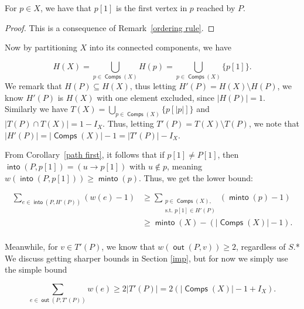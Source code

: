 \documentclass{article}
\DeclareMathOperator{\minto}{\bm{\mathsf{minto}}}
\DeclareMathOperator{\out}{\bm{\mathsf{out}}}
\DeclareMathOperator{\into}{\bm{\mathsf{into}}}
\DeclareMathOperator{\Comp}{\bm{\mathsf{Comps}}}
\newcommand{\edit}[1]{}%
\newcommand{\dc}[1]{}%
\newcommand{\zh}[1]{}%
\begin{document}
\vspace{1.75em}

\begin{cor}\label{path first} For $p \in X$, we have that $p[1]$ is the first vertex in $p$ reached by $P$. \begin{proof}This is a consequence of Remark~\ref{ordering rule}.\end{proof}\end{cor}

\vspace{1.75em}

Now by partitioning $X$ into its connected components, we have

\[H(X) = \bigcup_{p \in \Comp(X)} H(p) = \bigcup_{p \in \Comp(X)} \{p[1]\}.\]\edit{could try to better convey that this is true for any graph, and is not specific to $X$ }We remark that $H(P) \subseteq H(X)$, thus letting $H'(P) = H(X)\setminus H(P)$, we know $H'(P)$ is $H(X)$ with one element excluded, since $|H(P)| = 1$. Similarly we have $T(X) = \bigcup_{p \in \Comp(X)} \{p[|p|]\}$ and $|T(P) \cap T(X)| = 1-I_X$. Thus, letting $T'(P) = T(X)\setminus T(P)$, we note that $|H'(P)| = |\Comp(X)|-1 = |T'(P)|-I_X$.

From Corollary~\ref{path first}, it follows that if $p[1] \neq P[1]$, then $\into(P,p[1]) = (u \to p[1])$ with $u \not \in p$, meaning $w(\into(P,p[1])) \geq \minto(p)$. Thus, we get the lower bound:

\begin{align*}
    \sum_{e \in \into(P,H'(P))} (w(e)-1) &\geq \sum_{\substack{p \in \Comp(X),\\ \text{s.t. } p[1] \in H'(P)}}(\minto(p)-1)\\
    &\geq \minto(X) - (|\Comp(X)|-1).\\
\end{align*}
\dc{minto defined for graphs is a bit weird to me. I think it would be fine if (a) you made this two lines, so $LHS\le$[something with a sum][newline]$=$[something with minto] or (b) don't define minto for graphs and just use sums everywhere.}

Meanwhile, for $v \in T'(P)$, we know that $w(\out(P,v)) \geq 2$, regardless of $S$\dc{ do you even need to say ``regardless of $S$,'' since you have an explicit $S$ you are using?}\zh{ I like to generalize if it doesn't really cost more effort}.*\dc{ make footnote or merge into body} We discuss getting sharper bounds in Section \ref{imp}, but for now we simply use the simple bound

\[\sum_{e \in \out(P,T'(P))} w(e) \geq 2|T'(P)| = 2(|\Comp(X)|-1+I_X). \]
\end{document}
